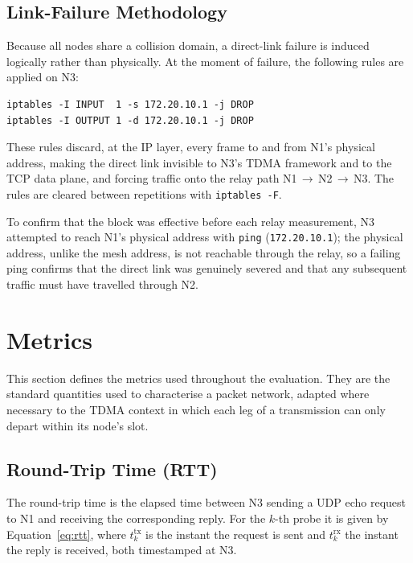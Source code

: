 \subsection{Link-Failure Methodology}
\label{subsec:linkfail}

Because all nodes share a collision domain, a direct-link failure is induced
logically rather than physically. At the moment of failure, the following
rules are applied on N3:

\begin{verbatim}
iptables -I INPUT  1 -s 172.20.10.1 -j DROP
iptables -I OUTPUT 1 -d 172.20.10.1 -j DROP
\end{verbatim}

These rules discard, at the IP layer, every frame to and from N1's physical
address, making the direct link invisible to N3's TDMA framework and to the
TCP data plane, and forcing traffic onto the relay path
N1\,$\to$\,N2\,$\to$\,N3. The rules are cleared between repetitions with
\texttt{iptables -F}.

To confirm that the block was effective before each relay measurement, N3
attempted to reach N1's physical address with \texttt{ping}
(\texttt{172.20.10.1}); the physical address, unlike the mesh address, is not
reachable through the relay, so a failing ping confirms that the direct link was
genuinely severed and that any subsequent traffic must have travelled through
N2.


\section{Metrics}
\label{sec:metrics}

This section defines the metrics used throughout the evaluation. They are the
standard quantities used to characterise a packet network, adapted where
necessary to the TDMA context in which each leg of a transmission can only
depart within its node's slot.

\subsection{Round-Trip Time (RTT)}
\label{subsec:m-rtt}

The round-trip time is the elapsed time between N3 sending a UDP echo request to
N1 and receiving the corresponding reply. For the $k$-th probe it is given by
Equation~\ref{eq:rtt}, where $t^{\mathrm{tx}}_k$ is the instant the request is
sent and $t^{\mathrm{rx}}_k$ the instant the reply is received, both timestamped
at N3.

